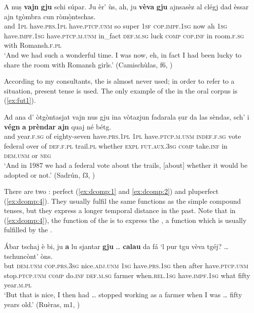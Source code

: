 \ea
\label{ex:plupf3}
\gll   A nuṣ \textbf{vajn} \textbf{gju} schi súpar. Ju èr' ùs, ah, ju \textbf{vèva} \textbf{gju} ajnsasèz al clégj dad èssar ajn tgòmbra cun ròmò̱ntschas.\\
and \textsc{1pl} have.\textsc{prs.1pl} have.\textsc{ptcp.unm} so super \textsc{1sf} \textsc{cop.impf.1sg} now ah \textsc{1sg} have.\textsc{impf.1sg} have.\textsc{ptcp.m.unm} in\_fact \textsc{def.m.sg} luck \textsc{comp} \textsc{cop.inf} in room.\textsc{f.sg} with Romansh.\textsc{f.pl}\\
\glt `And we had such a wonderful time. I was now, eh, in fact I had been lucky to share the room with Romansh girls.' (Camischùlas, f6, )
\z

\label{sec:4.1.2.2.5}
According to my consultants, the  is almost never used; in order to refer to a  situation, present tense is used. The only example of the  in the oral corpus is (\ref{ex:fut1}).

\ea\label{ex:fut1}
\gll Ad ana d' òtgòntasjat vajn nus gju ina vòtazjun fadarala ṣur da las sèndas, sch' i \textbf{végn} \textbf{a} \textbf{prèndar} \textbf{ajn} quaj né bétg.   \\
and year.\textsc{f.sg} of eighty-seven have.\textsc{prs.1pl} \textsc{1pl} have.\textsc{ptcp.m.unm} \textsc{indef.f.sg} vote federal over of \textsc{def.f.pl} trail.\textsc{pl} whether \textsc{expl} \textsc{fut.aux.3sg} \textsc{comp} take.\textsc{inf} in \textsc{dem.unm} or \textsc{neg}  \\
\glt `And in 1987 we had a federal vote about the trails, [about] whether it would be adopted or not.' (Sadrún, f3, )
\z

\label{sec:4.1.2.2.6}
There are two : perfect (\ref{ex:dcomp:1} and \ref{ex:dcomp:2}) and pluperfect (\ref{ex:dcomp:4}). They usually fulfil the same functions as the simple compound tenses, but they express a longer temporal distance in the past. Note that in (\ref{ex:dcomp:4}), the function of the  is to express the , a function which is usually fulfilled by the .

\ea
\label{ex:dcomp:1}
\gll    Ábar tschaj è bi, ju \textbf{a} lu sjantar \textbf{gju} … \textbf{calau} da fá `l pur tgu vèva tgéj? … tschuncònt’ òns.\\
but \textsc{dem.unm} \textsc{cop.prs.3sg} nice.\textsc{adj.unm} \textsc{1sg} have.\textsc{prs.1sg} then after have.\textsc{ptcp.unm} {} stop.\textsc{ptcp.unm} \textsc{comp} do.\textsc{inf} \textsc{def.m.sg} farmer when.\textsc{rel.1sg} have.\textsc{impf.1sg} what {} fifty year.\textsc{m.pl}\\
\glt `But that is nice, I then had … stopped working as a farmer when I was … fifty years old.' (Ruèras, m1, )
\z


